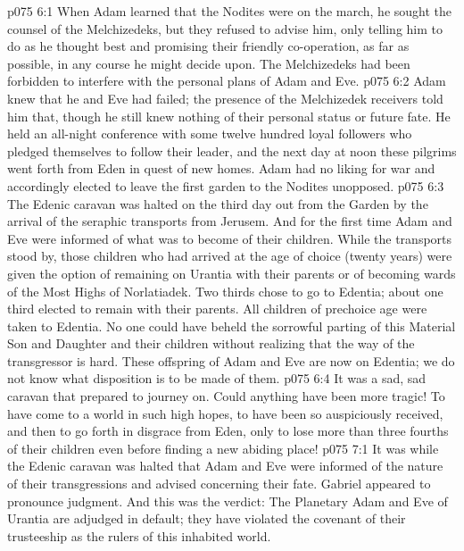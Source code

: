 \vs p075 6:1 When Adam learned that the Nodites were on the march, he sought the counsel of the Melchizedeks, but they refused to advise him, only telling him to do as he thought best and promising their friendly co\hyp{}operation, as far as possible, in any course he might decide upon. The Melchizedeks had been forbidden to interfere with the personal plans of Adam and Eve.
\vs p075 6:2 Adam knew that he and Eve had failed; the presence of the Melchizedek receivers told him that, though he still knew nothing of their personal status or future fate. He held an all\hyp{}night conference with some twelve hundred loyal followers who pledged themselves to follow their leader, and the next day at noon these pilgrims went forth from Eden in quest of new homes. Adam had no liking for war and accordingly elected to leave the first garden to the Nodites unopposed.
\vs p075 6:3 The Edenic caravan was halted on the third day out from the Garden by the arrival of the seraphic transports from Jerusem. And for the first time Adam and Eve were informed of what was to become of their children. While the transports stood by, those children who had arrived at the age of choice (twenty years) were given the option of remaining on Urantia with their parents or of becoming wards of the Most Highs of Norlatiadek. Two thirds chose to go to Edentia; about one third elected to remain with their parents. All children of prechoice age were taken to Edentia. No one could have beheld the sorrowful parting of this Material Son and Daughter and their children without realizing that the way of the transgressor is hard. These offspring of Adam and Eve are now on Edentia; we do not know what disposition is to be made of them.
\vs p075 6:4 It was a sad, sad caravan that prepared to journey on. Could anything have been more tragic! To have come to a world in such high hopes, to have been so auspiciously received, and then to go forth in disgrace from Eden, only to lose more than three fourths of their children even before finding a new abiding place!
%
\vs p075 7:1 It was while the Edenic caravan was halted that Adam and Eve were informed of the nature of their transgressions and advised concerning their fate. Gabriel appeared to pronounce judgment. And this was the verdict: The Planetary Adam and Eve of Urantia are adjudged in default; they have violated the covenant of their trusteeship as the rulers of this inhabited world.
